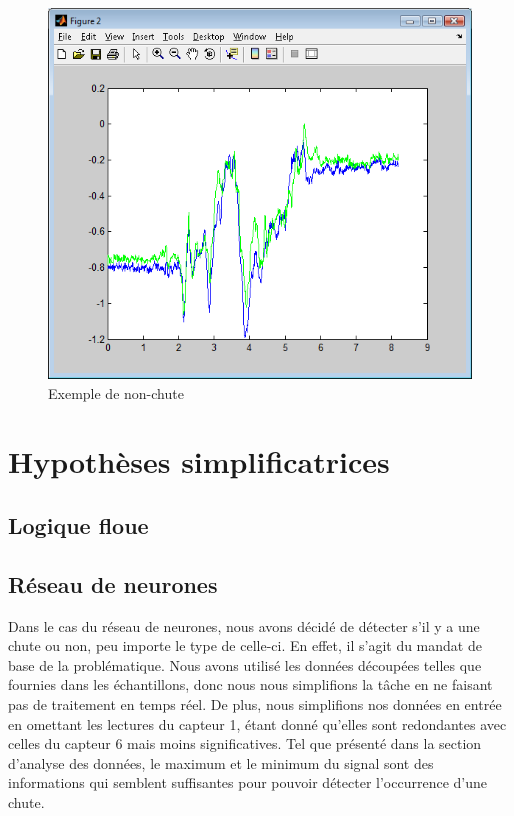 \documentclass[12pt,letterpaper]{article}
\begin{document}
\begin{figure}
\centering
\includegraphics[scale=0.5]{images/non_chute.png}
\caption{Exemple de non-chute}
\label{fig:non_chute}
\end{figure}

\section{Hypothèses simplificatrices}

\subsection{Logique floue}

\subsection{Réseau de neurones} %
Dans le cas du réseau de neurones, nous avons décidé de détecter s'il y a une chute ou non, peu importe le type de celle-ci. En effet, il s'agit du mandat de base de la problématique. Nous avons utilisé les données découpées telles que fournies dans les échantillons, donc nous nous simplifions la tâche en ne faisant pas de traitement en temps réel. De plus, nous simplifions nos données en entrée en omettant les lectures du capteur 1, étant donné qu'elles sont redondantes avec celles du capteur 6 mais moins significatives. Tel que présenté dans la section d'analyse des données, le maximum et le minimum du signal sont des informations qui semblent suffisantes pour pouvoir détecter l'occurrence d'une chute.
\end{document}
